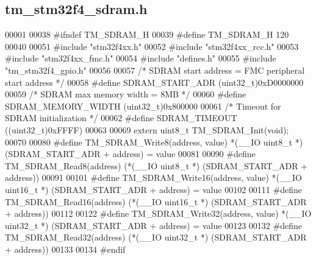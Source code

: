 \hypertarget{tm__stm32f4__sdram_8h_source}{}\subsection{tm\+\_\+stm32f4\+\_\+sdram.\+h}

\begin{DoxyCode}
00001 
00038 \textcolor{preprocessor}{#ifndef TM\_SDRAM\_H}
00039 \textcolor{preprocessor}{#define TM\_SDRAM\_H 120}
00040 
00051 \textcolor{preprocessor}{#include "stm32f4xx.h"}
00052 \textcolor{preprocessor}{#include "stm32f4xx\_rcc.h"}
00053 \textcolor{preprocessor}{#include "stm32f4xx\_fmc.h"}
00054 \textcolor{preprocessor}{#include "defines.h"}
00055 \textcolor{preprocessor}{#include "tm\_stm32f4\_gpio.h"}
00056 
00057 \textcolor{comment}{/* SDRAM start address = FMC peripheral start address */}
00058 \textcolor{preprocessor}{#define SDRAM\_START\_ADR         (uint32\_t)0xD0000000}
00059 \textcolor{comment}{/* SDRAM max memory width = 8MB */}
00060 \textcolor{preprocessor}{#define SDRAM\_MEMORY\_WIDTH      (uint32\_t)0x800000}
00061 \textcolor{comment}{/* Timeout for SDRAM initialization */}
00062 \textcolor{preprocessor}{#define SDRAM\_TIMEOUT           ((uint32\_t)0xFFFF) }
00063 
00069 \textcolor{keyword}{extern} uint8\_t TM\_SDRAM\_Init(\textcolor{keywordtype}{void});
00070 
00080 \textcolor{preprocessor}{#define TM\_SDRAM\_Write8(address, value)     *(\_\_IO uint8\_t *) (SDRAM\_START\_ADR + address) = value}
00081 
00090 \textcolor{preprocessor}{#define TM\_SDRAM\_Read8(address)             (*(\_\_IO uint8\_t *) (SDRAM\_START\_ADR + address))}
00091 
00101 \textcolor{preprocessor}{#define TM\_SDRAM\_Write16(address, value)    *(\_\_IO uint16\_t *) (SDRAM\_START\_ADR + address) = value}
00102 
00111 \textcolor{preprocessor}{#define TM\_SDRAM\_Read16(address)            (*(\_\_IO uint16\_t *) (SDRAM\_START\_ADR + address))}
00112 
00122 \textcolor{preprocessor}{#define TM\_SDRAM\_Write32(address, value)    *(\_\_IO uint32\_t *) (SDRAM\_START\_ADR + address) = value}
00123 
00132 \textcolor{preprocessor}{#define TM\_SDRAM\_Read32(address)            (*(\_\_IO uint32\_t *) (SDRAM\_START\_ADR + address))}
00133 
00134 \textcolor{preprocessor}{#endif}
\end{DoxyCode}
